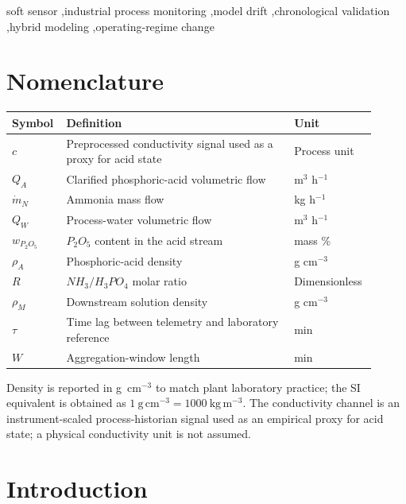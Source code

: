 \documentclass[preprint,12pt,authoryear]{elsarticle}
\begin{document}
\begin{frontmatter}
\begin{keyword}
soft sensor \sep industrial process monitoring \sep model drift \sep chronological validation \sep hybrid modeling \sep operating-regime change
\end{keyword}

\end{frontmatter}

\section*{Nomenclature}

\begin{table}[!ht]
\centering
\small
\begin{tabular}{@{}p{0.11\linewidth}p{0.60\linewidth}p{0.20\linewidth}@{}}
\toprule
\textbf{Symbol} & \textbf{Definition} & \textbf{Unit} \\
\midrule
$c$ & Preprocessed conductivity signal used as a proxy for acid state & Process unit \\
$Q_A$ & Clarified phosphoric-acid volumetric flow & m$^3$ h$^{-1}$ \\
$\dot m_N$ & Ammonia mass flow & kg h$^{-1}$ \\
$Q_W$ & Process-water volumetric flow & m$^3$ h$^{-1}$ \\
$w_{P_2O_5}$ & $P_2O_5$ content in the acid stream & mass \% \\
$\rho_A$ & Phosphoric-acid density & g cm$^{-3}$ \\
$R$ & $NH_3/H_3PO_4$ molar ratio & Dimensionless \\
$\rho_M$ & Downstream solution density & g cm$^{-3}$ \\
$\tau$ & Time lag between telemetry and laboratory reference & min \\
$W$ & Aggregation-window length & min \\
\bottomrule
\end{tabular}
\end{table}

\medskip
\noindent Density is reported in g~cm$^{-3}$ to match plant laboratory practice; the SI equivalent is obtained as $1~\mathrm{g\,cm^{-3}}=1000~\mathrm{kg\,m^{-3}}$. The conductivity channel is an instrument-scaled process-historian signal used as an empirical proxy for acid state; a physical conductivity unit is not assumed.

\section{Introduction}
\end{document}
